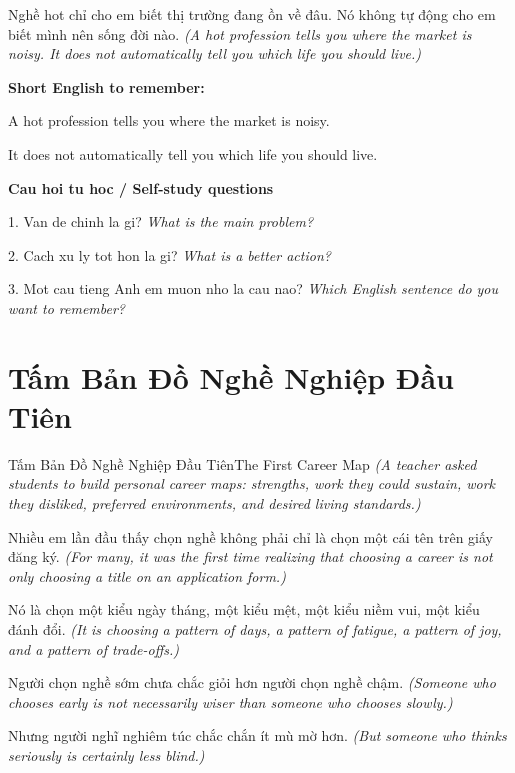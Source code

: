 \begin{baihoc}
Nghề hot chỉ cho em biết thị trường đang ồn về đâu. Nó không tự động cho em biết mình nên sống đời nào.
\textit{(A hot profession tells you where the market is noisy. It does not automatically tell you which life you should live.)}
\end{baihoc}

\begin{ghinhoanh}
\textbf{Short English to remember:}

A hot profession tells you where the market is noisy.

It does not automatically tell you which life you should live.

\end{ghinhoanh}

\begin{tuhocnhanh}
\textbf{Cau hoi tu hoc / Self-study questions}

1. Van de chinh la gi? \textit{What is the main problem?}

2. Cach xu ly tot hon la gi? \textit{What is a better action?}

3. Mot cau tieng Anh em muon nho la cau nao? \textit{Which English sentence do you want to remember?}
\end{tuhocnhanh}
\ngancach

\section{Tấm Bản Đồ Nghề Nghiệp Đầu Tiên}
\begin{truyen}{Tấm Bản Đồ Nghề Nghiệp Đầu Tiên}{The First Career Map}
\textit{(A teacher asked students to build personal career maps: strengths, work they could sustain, work they disliked, preferred environments, and desired living standards.)}

Nhiều em lần đầu thấy chọn nghề không phải chỉ là chọn một cái tên trên giấy đăng ký.
\textit{(For many, it was the first time realizing that choosing a career is not only choosing a title on an application form.)}

Nó là chọn một kiểu ngày tháng, một kiểu mệt, một kiểu niềm vui, một kiểu đánh đổi.
\textit{(It is choosing a pattern of days, a pattern of fatigue, a pattern of joy, and a pattern of trade-offs.)}

Người chọn nghề sớm chưa chắc giỏi hơn người chọn nghề chậm.
\textit{(Someone who chooses early is not necessarily wiser than someone who chooses slowly.)}

Nhưng người nghĩ nghiêm túc chắc chắn ít mù mờ hơn.
\textit{(But someone who thinks seriously is certainly less blind.)}

\end{truyen}

